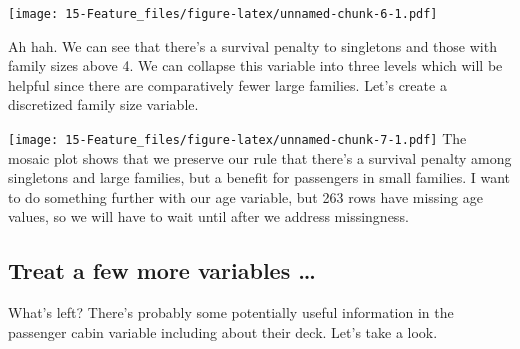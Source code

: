 \documentclass[]{book}
\newenvironment{Shaded}{\begin{snugshade}}{\end{snugshade}}
\newcommand{\KeywordTok}[1]{\textcolor[rgb]{0.13,0.29,0.53}{\textbf{#1}}}
\newcommand{\DataTypeTok}[1]{\textcolor[rgb]{0.13,0.29,0.53}{#1}}
\newcommand{\DecValTok}[1]{\textcolor[rgb]{0.00,0.00,0.81}{#1}}
\newcommand{\StringTok}[1]{\textcolor[rgb]{0.31,0.60,0.02}{#1}}
\newcommand{\CommentTok}[1]{\textcolor[rgb]{0.56,0.35,0.01}{\textit{#1}}}
\newcommand{\OtherTok}[1]{\textcolor[rgb]{0.56,0.35,0.01}{#1}}
\newcommand{\OperatorTok}[1]{\textcolor[rgb]{0.81,0.36,0.00}{\textbf{#1}}}
\newcommand{\NormalTok}[1]{#1}
\theoremstyle{definition}
\theoremstyle{definition}
\theoremstyle{definition}
\theoremstyle{remark}
\begin{document}
\texttt{[image: 15-Feature\_files/figure-latex/unnamed-chunk-6-1.pdf]}

Ah hah. We can see that there's a survival penalty to singletons and
those with family sizes above 4. We can collapse this variable into
three levels which will be helpful since there are comparatively fewer
large families. Let's create a discretized family size variable.

\begin{Shaded}
\end{Shaded}

\texttt{[image: 15-Feature\_files/figure-latex/unnamed-chunk-7-1.pdf]}
The mosaic plot shows that we preserve our rule that there's a survival
penalty among singletons and large families, but a benefit for
passengers in small families. I want to do something further with our
age variable, but 263 rows have missing age values, so we will have to
wait until after we address missingness.

\subsection{Treat a few more variables
\ldots{}}\label{treat-a-few-more-variables}

What's left? There's probably some potentially useful information in the
passenger cabin variable including about their deck. Let's take a look.
\end{document}
